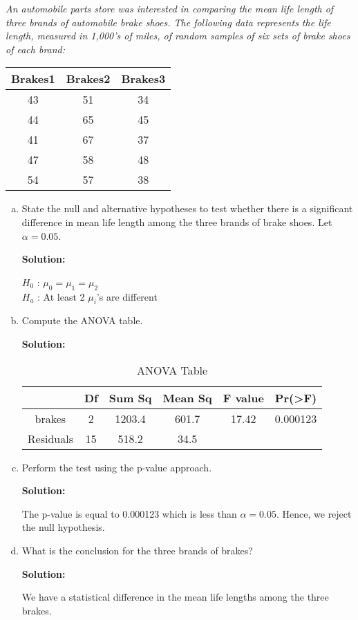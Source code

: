 \documentclass[12pt,letterpaper]{article}
\begin{document}
\textit{An automobile parts store was interested in comparing the mean life length of three
brands of automobile brake shoes. The following data represents the life length,
measured in 1,000’s of miles, of random samples of six sets of brake shoes of each
brand:}
\begin{center}
  \begin{tabular}{ |c|c|c| }
    \hline
    Brakes1 & Brakes2 & Brakes3\\
    \hline
    43 & 51 & 34\\
    44 & 65 & 45\\
    41 & 67 & 37\\
    47 & 58 & 48\\
    54 & 57 & 38\\
    \hline
  \end{tabular}
\end{center}

\begin{enumerate}[a.] \setlength{\itemsep}{30pt}
  \item State the null and alternative hypotheses to test whether there is a significant
  difference in mean life length among the three brands of brake shoes. Let $\alpha = 0.05$.
  
  \textbf{Solution:}

  $H_0$ : $\mu_0 = \mu_1 = \mu_2$\\
  $H_a$ : At least 2 $\mu_i$'s are different
  \item Compute the ANOVA table.

  \textbf{Solution:}

  \begin{table}[h]
    \centering
    \begin{tabular}{ c|ccccc }
      & Df & Sum Sq & Mean Sq & F value & Pr(>F)\\
      \hline
      brakes & 2 & 1203.4 & 601.7 & 17.42 & 0.000123\\
      Residuals & 15 & 518.2 & 34.5 & & \\
    \end{tabular}
    \caption{ANOVA Table}
  \end{table}
  \item Perform the test using the p-value approach.

  \textbf{Solution:}

  The p-value is equal to 0.000123 which is less than $\alpha = 0.05$.
  Hence, we reject the null hypothesis.
  \item What is the conclusion for the three brands of brakes?

  \textbf{Solution:}
  
  We have a statistical difference in the mean life lengths among the three brakes.
\end{enumerate}
\newpage

\end{document}
